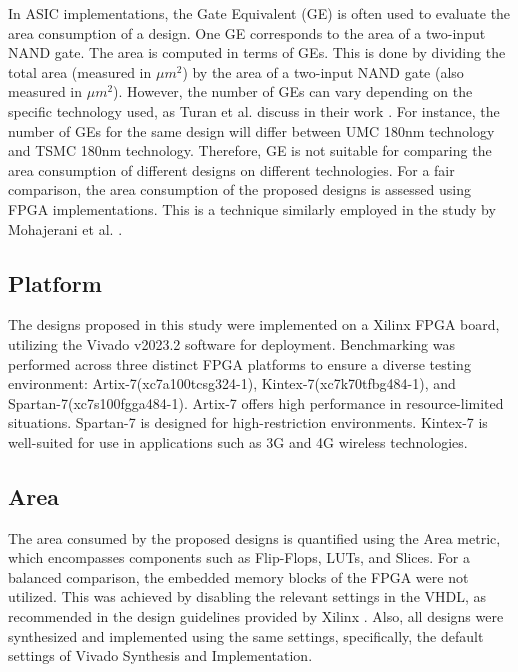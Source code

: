 \documentclass[final,5p,times,twocolumn]{elsarticle}
\begin{document}
In ASIC implementations, the Gate Equivalent (GE) is often used to evaluate the area consumption of a design.
One GE corresponds to the area of a two-input NAND gate.
The area is computed in terms of GEs.
This is done by dividing the total area (measured in $\mu m^2$) by the area of a two-input NAND gate (also measured in $\mu m^2$).
However, the number of GEs can vary depending on the specific technology used, as Turan et al. discuss in their work \cite{Turan}.
For instance, the number of GEs for the same design will differ between UMC 180nm technology and TSMC 180nm technology.
Therefore, GE is not suitable for comparing the area consumption of different designs on different technologies.
For a fair comparison, the area consumption of the proposed designs is assessed using FPGA implementations.
This is a technique similarly employed in the study by Mohajerani et al. \cite{Mohajerani2020}.

\subsection{Platform}\label{subsec4}

The designs proposed in this study were implemented on a Xilinx FPGA board, utilizing the Vivado v2023.2 software for deployment.
Benchmarking was performed across three distinct FPGA platforms to ensure a diverse testing environment: Artix-7(xc7a100tcsg324-1), Kintex-7(xc7k70tfbg484-1), and Spartan-7(xc7s100fgga484-1).
Artix-7 offers high performance in resource-limited situations. Spartan-7 is designed for high-restriction environments. Kintex-7 is well-suited for use in applications such as 3G and 4G wireless technologies.


\subsection{Area}\label{subsec5}

The area consumed by the proposed designs is quantified using the Area metric, which encompasses components such as Flip-Flops, LUTs, and Slices.
For a balanced comparison, the embedded memory blocks of the FPGA were not utilized.
This was achieved by disabling the relevant settings in the VHDL, as recommended in the design guidelines provided by Xilinx \cite{xilinx2022ultrafast}.
Also, all designs were synthesized and implemented using the same settings, specifically, the default settings of Vivado Synthesis and Implementation.
\end{document}

